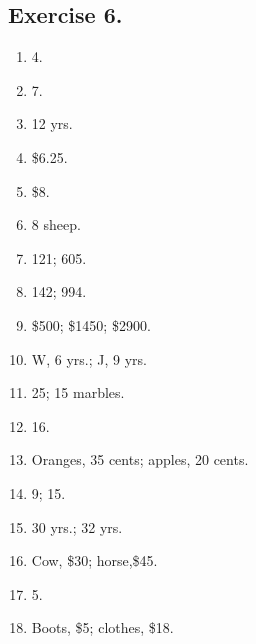 \documentclass{book}
\begin{document}
\subsection*{Exercise 6.}
\begin{enumerate}
\item 4.

\item 7.

\item 12 yrs.

\item \$6.25.

\item \$8.

\item 8 sheep.

\item 121; 605.

\item 142; 994.

\item \$500; \$1450; \$2900.

\item W, 6 yrs.; J, 9 yrs.

\item 25; 15 marbles.

\item 16.

\item Oranges, 35 cents; apples, 20 cents.

\item 9; 15.

\item 30 yrs.; 32 yrs.

\item Cow, \$30; horse,\$45.

\item 5.

\item Boots, \$5; clothes, \$18.
\end{enumerate}
\end{document}
